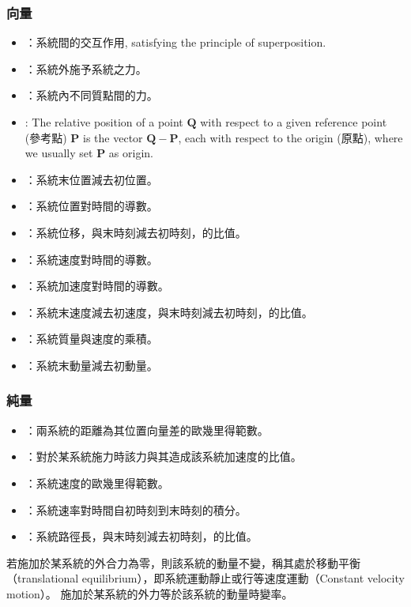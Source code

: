 \documentclass[a4paper,12pt]{article}
\begin{document}
\subsubsection{向量}
\begin{itemize}
\item{}：系統間的交互作用, satisfying the principle of superposition.
\item{}：系統外施予系統之力。
\item{}：系統內不同質點間的力。
\item{}: The relative position of a point $\mathbf{Q}$ with respect to a given reference point (參考點) $\mathbf{P}$ is the vector $\mathbf{Q}-\mathbf{P}$, each with respect to the origin (原點), where we usually set $\mathbf{P}$ as origin.
\item{}：系統末位置減去初位置。
\item{}：系統位置對時間的導數。
\item{}：系統位移，與末時刻減去初時刻，的比值。
\item{}：系統速度對時間的導數。
\item{}：系統加速度對時間的導數。
\item{}：系統末速度減去初速度，與末時刻減去初時刻，的比值。
\item{}：系統質量與速度的乘積。
\item{}：系統末動量減去初動量。
\end{itemize}
\subsubsection{純量}
\begin{itemize}
\item{}：兩系統的距離為其位置向量差的歐幾里得範數。
\item{}：對於某系統施力時該力與其造成該系統加速度的比值。
\item{}：系統速度的歐幾里得範數。
\item{}：系統速率對時間自初時刻到末時刻的積分。
\item{}：系統路徑長，與末時刻減去初時刻，的比值。
\end{itemize}
若施加於某系統的外合力為零，則該系統的動量不變，稱其處於移動平衡（translational equilibrium），即系統運動靜止或行等速度運動（Constant velocity motion）。
施加於某系統的外力等於該系統的動量時變率。
\end{document}
